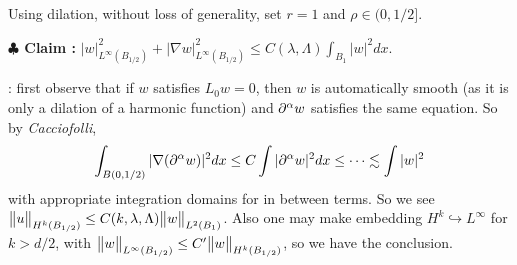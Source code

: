 \documentclass[12pt,a4paper]{article}
\newenvironment{proof}
{\begin{changemargin}{0.5cm}{0.5cm} 
	}%
	{\end{changemargin}
}
\newenvironment{subproof}
{\begin{changemargin}{0.5cm}{0.5cm} 
	}%
	{\end{changemargin}
}
\newenvironment{p}
{\begin{proof} 
	}%
	{\end{proof}
}
\begin{document}
\begin{p}
\pf Using dilation, without loss of generality, set $r=1$ and $\rho \in (0,1/2]$.

\textbf{$\clubsuit$ Claim :} $|w|^2_{L^{\infty}(B_{1/2})} + |\nabla w|^2_{L^{\infty}(B_{1/2})} \leq C(\lambda, \Lambda)\int_{B_1} |w|^2 dx$.
\begin{subproof}
: first observe that if $w$ satisfies $L_0 w =0$, then $w$ is automatically smooth (as it is only a dilation of a harmonic function) and $\partial^{\alpha} w$ satisfies the same equation. So by \emph{Cacciofolli},
\begin{align*}
\int_{B(0, 1/2)} |\nabla (\partial^{\alpha} w)|^2 dx \leq C \int |\partial^{\alpha} w|^2 dx \leq \cdots \lesssim \int |w|^2 
\end{align*}
with appropriate integration domains for in between terms. So we see $\bigl\lVert u\bigr\rVert_{H^k(B_{1/2})} \leq C(k, \lambda, \Lambda)\bigl\lVert w\bigr\rVert_{L^2(B_1)}$. Also one may make embedding $H^k \hookrightarrow L^{\infty}$ for $k>d/2$, with $\bigl\lVert w\bigr\rVert_{L^{\infty}(B_{1/2})} \leq C' \bigl\lVert w\bigr\rVert_{H^k(B_{1/2})}$, so we have the conclusion.


\end{subproof}
\end{p}
\end{document}
